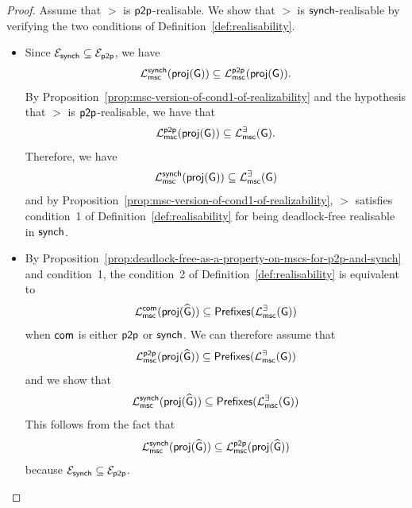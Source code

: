 \begin{proof}
Assume that $\gt$ is $\mathsf{p2p}$-realisable. We show that $\gt$ is $\mathsf{synch}$-realisable by verifying the 
two conditions of Definition~\ref{def:realisability}.   
\begin{itemize}
\item 
    Since $\mathcal{E}_{\mathsf{synch}}\subseteq\mathcal{E}_{\mathsf{p2p}}$, we have
    $$\mathcal{L}_{\mathsf{msc}}^{\mathsf{synch}}(\mathsf{proj}(\mathsf{G}))\subseteq\mathcal{L}_{\mathsf{msc}}^{\mathsf{p2p}}(\mathsf{proj}(\mathsf{G})).$$
    By Proposition~\ref{prop:msc-version-of-cond1-of-realizability} and the hypothesis that 
    $\gt$ is $\mathsf{p2p}$-realisable, we have that
    $$\mathcal{L}_{\mathsf{msc}}^{\mathsf{p2p}}(\mathsf{proj}(\mathsf{G})) \subseteq \mathcal{L}_{\mathsf{msc}}^{\exists}(\mathsf{G}).
    $$
    Therefore, we have
    $$\mathcal{L}_{\mathsf{msc}}^{\mathsf{synch}}(\mathsf{proj}(\mathsf{G})) \subseteq \mathcal{L}_{\mathsf{msc}}^{\exists}(\mathsf{G})$$
    and by Proposition~\ref{prop:msc-version-of-cond1-of-realizability}, $\gt$ satisfies condition~1 of Definition~\ref{def:realisability}
    for being deadlock-free realisable in $\mathsf{synch}$.

\item By Proposition~\ref{prop:deadlock-free-as-a-property-on-mscs-for-p2p-and-synch} and condition~1, the condition~2 of
    Definition~\ref{def:realisability} is equivalent to
    $$
        \mathcal{L}_{\mathsf{msc}}^{\mathsf{com}}(\mathsf{proj}(\widehat{\mathsf{G}}))\subseteq\mathsf{Prefixes}(\mathcal{L}_{\mathsf{msc}}^{\exists}(\mathsf{G}))
    $$
    when $\mathsf{com}$ is either $\mathsf{p2p}$ or $\mathsf{synch}$.
    We can therefore assume that 
    $$
        \mathcal{L}_{\mathsf{msc}}^{\mathsf{p2p}}(\mathsf{proj}(\widehat{\mathsf{G}}))\subseteq\mathsf{Prefixes}(\mathcal{L}_{\mathsf{msc}}^{\exists}(\mathsf{G}))
    $$
    and we show that 
    $$
        \mathcal{L}_{\mathsf{msc}}^{\mathsf{synch}}(\mathsf{proj}(\widehat{\mathsf{G}}))\subseteq\mathsf{Prefixes}(\mathcal{L}_{\mathsf{msc}}^{\exists}(\mathsf{G}))
    $$
    This follows from the fact that
    $$
        \mathcal{L}_{\mathsf{msc}}^{\mathsf{synch}}(\mathsf{proj}(\widehat{\mathsf{G}}))\subseteq\mathcal{L}_{\mathsf{msc}}^{\mathsf{p2p}}(\mathsf{proj}(\widehat{\mathsf{G}}))
    $$
    because $\mathcal{E}_{\mathsf{synch}}\subseteq\mathcal{E}_{\mathsf{p2p}}$.
\end{itemize}
\end{proof}


